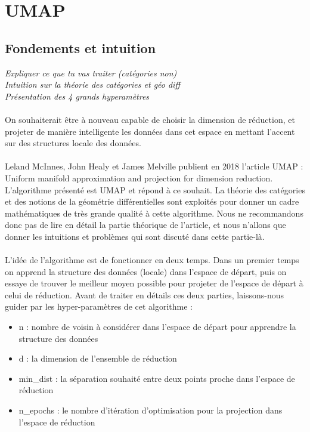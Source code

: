 \chapter{UMAP}

    \section{Fondements et intuition}
        \textit{
        Expliquer ce que tu vas traiter (catégories non)
        \\
        Intuition sur la théorie des catégories et géo diff
        \\
        Présentation des 4 grands hyperamètres
        }
        \\
        \\
        On souhaiterait être à nouveau capable de choisir la dimension de réduction, et projeter de manière intelligente les données dans cet espace en mettant l’accent sur des structures locale des données.
        \\
        \\
        Leland McInnes, John Healy et James Melville publient en 2018 l’article UMAP : Uniform manifold approximation and projection for dimension reduction. L’algorithme présenté est UMAP et répond à ce souhait. La théorie des catégories et des notions de la géométrie différentielles sont exploités pour donner un cadre mathématiques de très grande qualité à cette algorithme. Nous ne recommandons donc pas de lire en détail la partie théorique de l’article, et nous n’allons que donner les intuitions et problèmes qui sont discuté dans cette partie-là.
        \\
        \\
        L’idée de l’algorithme est de fonctionner en deux temps. Dans un premier temps on apprend la structure des données (locale) dans l’espace de départ, puis on essaye de trouver le meilleur moyen possible pour projeter de l’espace de départ à celui de réduction. Avant de traiter en détails ces deux parties, laissons-nous guider par les hyper-paramètres de cet algorithme :
        \begin{itemize}
            \item n : nombre de voisin à considérer dans l’espace de départ pour apprendre la structure des données
            \item d : la dimension de l’ensemble de réduction
            \item min\_dist : la séparation souhaité entre deux points proche dans l’espace de réduction
            \item n\_epochs : le nombre d’itération d’optimisation pour la projection dans l’espace de réduction
        \end{itemize}
